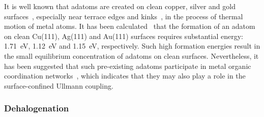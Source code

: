 \documentclass[aps,prb,reprint,amsmath,amssymb]{revtex4-1}
\begin{document}
{%

It is well known that adatoms are created on clean copper, silver and gold surfaces~\cite{ullmann_79, ullmann_58}, especially near terrace edges and kinks~\cite{ullmann_84, ullmann_85}, in the process of thermal motion of metal atoms. 
It has been calculated~\cite{chemeurope2017} that the formation of an adatom on clean Cu(111), Ag(111) and Au(111) surfaces requires substantial energy: \SI{1.71}{\electronvolt}, \SI{1.12}{\electronvolt} and \SI{1.15}{\electronvolt}, respectively. Such high formation energies result in the small equilibrium concentration of adatoms on clean surfaces.  
Nevertheless, it has been suggested that such pre-existing adatoms participate in metal organic coordination networks~\cite{ullmann_80, ullmann_81, ullmann_82, ullmann_83}, which indicates that they may also play a role in the surface-confined Ullmann coupling.


}

\ifdefined\INTERNAL

\subsubsection{Dehalogenation}
\end{document}
